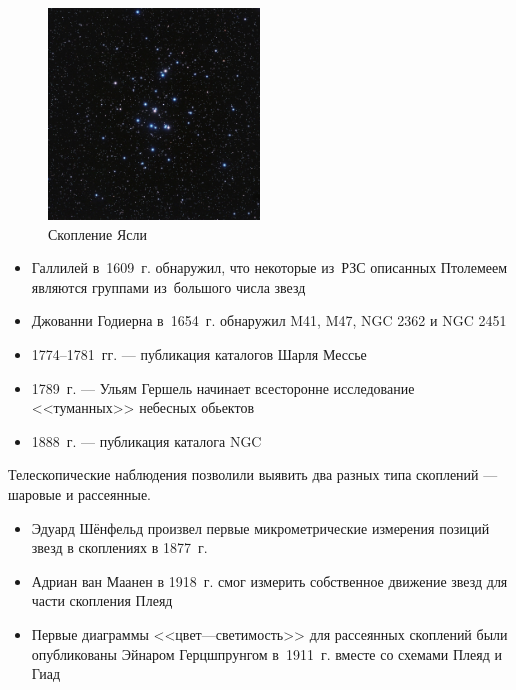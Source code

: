 \documentclass{beamer}
\begin{document}
    \begin{frame}
        \begin{figure}
            \centering
            \includegraphics[width=0.5\textwidth]{pictures/yasli.jpg}
            \caption{Скопление Ясли}
        \end{figure}
    \end{frame}
    \begin{frame}
        \begin{itemize}
            \item Галлилей в~1609~г. обнаружил, что некоторые из~РЗС описанных Птолемеем являются группами из~большого числа звезд
            \item Джованни Годиерна в~1654~г. обнаружил M41, M47, NGC 2362 и NGC 2451
            \item 1774--1781~гг. --- публикация каталогов Шарля Мессье
            \item 1789~г. --- Ульям Гершель начинает всесторонне исследование <<туманных>> небесных обьектов
            \item 1888~г. --- публикация каталога NGC
        \end{itemize}
        Телескопические наблюдения позволили выявить два разных типа скоплений --- шаровые и рассеянные.
    \end{frame}
    \begin{frame}
        \large
        \begin{itemize}
            \item Эдуард Шёнфельд произвел первые микрометрические измерения позиций звезд в скоплениях в 1877~г.
            \item Адриан ван Маанен в 1918~г. смог измерить собственное движение звезд для части скопления Плеяд
            \item Первые диаграммы <<цвет—светимость>> для рассеянных скоплений были опубликованы Эйнаром Герцшпрунгом в~1911~г. вместе со схемами Плеяд и Гиад
        \end{itemize}
    \end{frame}
\end{document}
